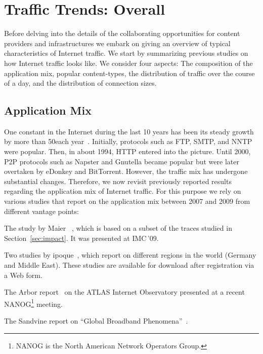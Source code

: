 \section{Traffic Trends: Overall}\label{sec:traffic}

Before delving into the details of the collaborating opportunities for content
providers and infrastructures we embark on giving an overview of typical
characteristics of Internet traffic.  We start by summarizing previous studies
on how Internet traffic looks like. We consider four aspects: \first The
composition of the application mix, \second popular content-types, \third the
distribution of traffic over the course of a day, and \fourth the distribution
of connection sizes.

\subsection{Application Mix}\label{sec:related:appmix}


One constant in the Internet during the last 10 years has been its steady
growth by more than 50\perc each year~\cite{andrew03growth,telegeography2008}.
Initially, protocols such as FTP, SMTP, and NNTP were popular. Then, in about
1994, HTTP entered into the picture. Until 2000, P2P protocols such as Napster
and Gnutella became popular but were later overtaken by eDonkey and BitTorrent.
However, the traffic mix has undergone substantial changes. Therefore, we now
revisit previously reported results regarding the application mix of Internet
traffic. For this purpose we rely on various studies that report on the
application mix between 2007 and 2009 from different vantage points:

\begin{itemize*}

\item The study by Maier \etal~\cite{OnDominantCharacteristics2009}, which is
based on a subset of the traces studied in Section~\ref{sec:impact}. It was
presented at IMC\,'09.

\item Two studies by ipoque~\cite{ipoque09}, which report on different regions
in the world (Germany and Middle East).  These studies are available for
download after registration via a Web form.

\item The Arbor report~\cite{arbor} on the ATLAS Internet Observatory presented
at a recent NANOG\footnote{NANOG is the North American Network Operators
Group.} meeting.

\item The Sandvine report on ``Global Broadband Phenomena''~\cite{sandvine}.

\end{itemize*}

